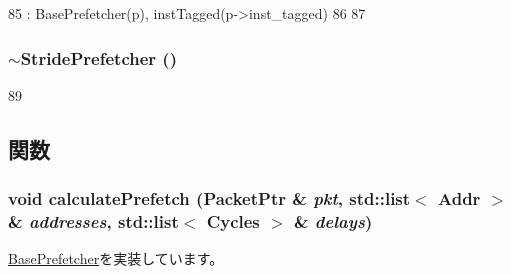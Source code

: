 \begin{DoxyCode}
85         : BasePrefetcher(p), instTagged(p->inst_tagged)
86     {
87     }
\end{DoxyCode}
\hypertarget{classStridePrefetcher_ab40ed6a991c78a4fecd687df2ba79582}{
\subsubsection[{$\sim$StridePrefetcher}]{\setlength{\rightskip}{0pt plus 5cm}$\sim${\bf StridePrefetcher} ()}}
\label{classStridePrefetcher_ab40ed6a991c78a4fecd687df2ba79582}



\begin{DoxyCode}
89 {}
\end{DoxyCode}


\subsection{関数}
\hypertarget{classStridePrefetcher_a1cc3d838a8314074cfda794f18eb6de9}{
\subsubsection[{calculatePrefetch}]{\setlength{\rightskip}{0pt plus 5cm}void calculatePrefetch ({\bf PacketPtr} \& {\em pkt}, \/  {\bf std::list}$<$ {\bf Addr} $>$ \& {\em addresses}, \/  {\bf std::list}$<$ {\bf Cycles} $>$ \& {\em delays})}}
\label{classStridePrefetcher_a1cc3d838a8314074cfda794f18eb6de9}


\hyperlink{classBasePrefetcher_a3db7131bcae7e87e8146195a6e8be817}{BasePrefetcher}を実装しています。


